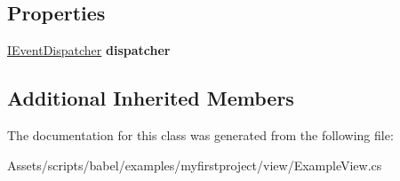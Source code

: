 \subsection*{Properties}
\begin{DoxyCompactItemize}
\item 
\hypertarget{classbabel_1_1examples_1_1myfirstproject_1_1_example_view_a8071c6a62de597fa374387033013820c}{\hyperlink{interfacebabel_1_1extensions_1_1dispatcher_1_1eventdispatcher_1_1api_1_1_i_event_dispatcher}{I\-Event\-Dispatcher} {\bfseries dispatcher}}\label{classbabel_1_1examples_1_1myfirstproject_1_1_example_view_a8071c6a62de597fa374387033013820c}

\end{DoxyCompactItemize}
\subsection*{Additional Inherited Members}


The documentation for this class was generated from the following file\-:\begin{DoxyCompactItemize}
\item 
Assets/scripts/babel/examples/myfirstproject/view/Example\-View.\-cs\end{DoxyCompactItemize}
